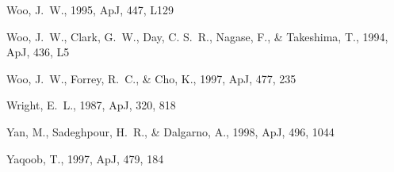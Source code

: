 \documentclass{aastex}
\begin{document}
\begin{thebibliography}{}
Woo, J.~W.,  1995, ApJ, 447, L129

Woo, J.~W., Clark, G.~W., Day, C. S.~R., Nagase, F., \& Takeshima, T.,  1994,
  ApJ, 436, L5

Woo, J.~W., Forrey, R.~C., \& Cho, K.,  1997, ApJ, 477, 235

Wright, E.~L.,  1987, ApJ, 320, 818

Yan, M., Sadeghpour, H.~R., \& Dalgarno, A.,  1998, ApJ, 496, 1044

Yaqoob, T.,  1997, ApJ, 479, 184

\end{thebibliography}

\appendix
\end{document}
